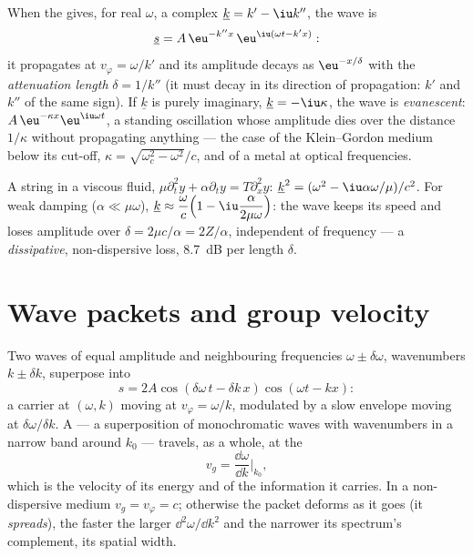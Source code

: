 \begin{definition}\label{def:b2:dispersion-wave-packets:complex}
When the  gives, for real $\omega$, a complex
$\underline k = k' - \iu k''$, the wave is
\[
\underline s = A\,\eu^{-k''x}\,\eu^{\iu(\omega t - k'x)} :
\]
it propagates at $v_\varphi = \omega/k'$ and its amplitude decays as
$\eu^{-x/\delta}$ with the \emph{attenuation length} $\delta = 1/k''$ (it must
decay in its direction of propagation: $k'$ and $k''$ of the same sign).
If $\underline k$ is purely imaginary, $\underline k = -\iu\kappa$, the wave is
\emph{evanescent}: $A\,\eu^{-\kappa x}\eu^{\iu\omega t}$, a standing oscillation
whose amplitude dies over the distance $1/\kappa$ without propagating
anything --- the case of the Klein--Gordon medium below its cut-off,
$\kappa = \sqrt{\omega_c^2 - \omega^2}/c$, and of a metal at optical frequencies.
\end{definition}

\begin{example}\label{ex:b2:dispersion-wave-packets:damped}
A string in a viscous fluid, $\mu\partial_t^2y + \alpha\partial_ty = T\partial_x^2y$:
$\underline k^2 = (\omega^2 - \iu\alpha\omega/\mu)/c^2$. For weak damping ($\alpha \ll \mu
\omega$), $\underline k \approx \dfrac\omega c\Bigl(1 - \iu\dfrac{\alpha}{2\mu\omega}\Bigr)$: the wave
keeps its speed and loses amplitude over $\delta = 2\mu c/\alpha = 2Z/\alpha$,
independent of frequency --- a \emph{dissipative}, non-dispersive loss,
\qty{8.7}{dB} per length $\delta$.
\end{example}

\section{Wave packets and group velocity}

\begin{proposition}\label{prop:b2:dispersion-wave-packets:group}
Two waves of equal amplitude and neighbouring frequencies $\omega \pm
\delta\omega$, wavenumbers $k \pm \delta k$, superpose into
\[
s = 2A\cos(\delta\omega\,t - \delta k\,x)\cos(\omega t - kx) :
\]
a carrier at $(\omega, k)$ moving at $v_\varphi = \omega/k$, modulated by a slow
envelope moving at $\delta\omega/\delta k$. A \emph{} --- a
superposition of monochromatic waves with wavenumbers in a narrow band
around $k_0$ --- travels, as a whole, at the \emph{}
\[
v_g = \frac{\dd\omega}{\dd k}\Bigr|_{k_0} ,
\]
which is the velocity of its energy and of the information it carries.
In a non-dispersive medium $v_g = v_\varphi = c$; otherwise the packet
deforms as it goes (it \emph{spreads}), the faster the larger
$\dd^2\omega/\dd k^2$ and the narrower its spectrum's complement, its
spatial width.
\end{proposition}

